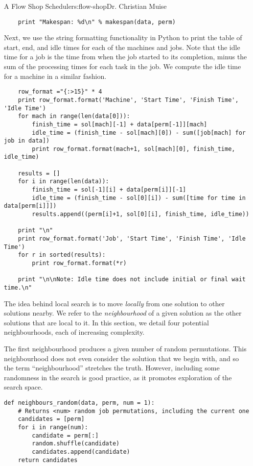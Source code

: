 \begin{aosachapter}{A Flow Shop Scheduler}{s:flow-shop}{Dr. Christian Muise}
\begin{verbatim}
    print "Makespan: %d\n" % makespan(data, perm)
\end{verbatim}

Next, we use the string formatting functionality in Python to print the
table of start, end, and idle times for each of the machines and jobs.
Note that the idle time for a job is the time from when the job started
to its completion, minus the sum of the processing times for each task
in the job. We compute the idle time for a machine in a similar fashion.

\begin{verbatim}
    row_format ="{:>15}" * 4
    print row_format.format('Machine', 'Start Time', 'Finish Time', 'Idle Time')
    for mach in range(len(data[0])):
        finish_time = sol[mach][-1] + data[perm[-1]][mach]
        idle_time = (finish_time - sol[mach][0]) - sum([job[mach] for job in data])
        print row_format.format(mach+1, sol[mach][0], finish_time, idle_time)

    results = []
    for i in range(len(data)):
        finish_time = sol[-1][i] + data[perm[i]][-1]
        idle_time = (finish_time - sol[0][i]) - sum([time for time in data[perm[i]]])
        results.append((perm[i]+1, sol[0][i], finish_time, idle_time))

    print "\n"
    print row_format.format('Job', 'Start Time', 'Finish Time', 'Idle Time')
    for r in sorted(results):
        print row_format.format(*r)

    print "\n\nNote: Idle time does not include initial or final wait time.\n"
\end{verbatim}

\label{neighbourhoods}

The idea behind local search is to move \emph{locally} from one solution
to other solutions nearby. We refer to the \emph{neighbourhood} of a
given solution as the other solutions that are local to it. In this
section, we detail four potential neighbourhoods, each of increasing
complexity.

The first neighbourhood produces a given number of random permutations.
This neighbourhood does not even consider the solution that we begin
with, and so the term ``neighbourhood'' stretches the truth. However,
including some randomness in the search is good practice, as it promotes
exploration of the search space.

\begin{verbatim}
def neighbours_random(data, perm, num = 1):
    # Returns <num> random job permutations, including the current one
    candidates = [perm]
    for i in range(num):
        candidate = perm[:]
        random.shuffle(candidate)
        candidates.append(candidate)
    return candidates
\end{verbatim}


\end{aosachapter}
